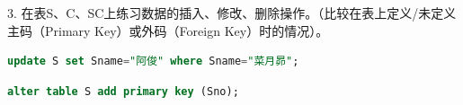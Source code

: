 \documentclass[12pt, a4paper]{report}
\begin{document}
3. 在表S、C、SC上练习数据的插入、修改、删除操作。（比较在表上定义/未定义主码（Primary Key）或外码（Foreign Key）时的情况）。\\

\begin{lstlisting}[language=SQL]
    update S set Sname="阿俊" where Sname="菜月昴";
\end{lstlisting}

\begin{figure}[H] %
    \centering %
\end{figure}

\begin{lstlisting}[language=SQL]
    alter table S add primary key (Sno);
\end{lstlisting}
\end{document}
